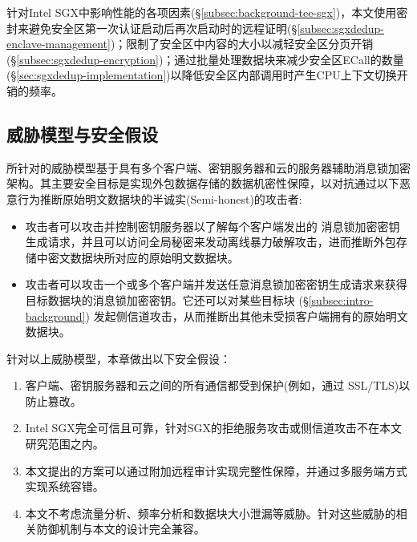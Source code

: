 针对Intel SGX中影响性能的各项因素(\S\ref{subsec:background-tee-sgx})，本文使用密封来避免安全区第一次认证启动后再次启动时的远程证明(\S\ref{subsec:sgxdedup-enclave-management})；限制了安全区中内容的大小以减轻安全区分页开销(\S\ref{subsec:sgxdedup-encryption})；通过批量处理数据块来减少安全区ECall的数量(\S\ref{sec:sgxdedup-implementation})以降低安全区内部调用时产生CPU上下文切换开销的频率。

\subsection{威胁模型与安全假设}
\label{subsec:sgxdedup-threat}

\sysnameS 所针对的威胁模型基于具有多个客户端、密钥服务器和云的服务器辅助消息锁加密架构\cite{bellare2013DupLESS}。其主要安全目标是实现外包数据存储\cite{bellare2013DupLESS}的数据机密性保障，以对抗通过以下恶意行为推断原始明文数据块的半诚实(Semi-honest)的攻击者:

\begin{itemize}[leftmargin=*]
    \item 攻击者可以攻击并控制密钥服务器以了解每个客户端发出的 消息锁加密密钥生成请求，并且可以访问全局秘密来发动离线暴力破解攻击\cite{bellare2013DupLESS}，进而推断外包存储中密文数据块所对应的原始明文数据块。
    \item 攻击者可以攻击一个或多个客户端并发送任意消息锁加密密钥生成请求来获得目标数据块的消息锁加密密钥\cite{bellare2013DupLESS}。它还可以对某些目标块 \cite{harnik2010side} (\S\ref{subsec:intro-background}) 发起侧信道攻击，从而推断出其他未受损客户端拥有的原始明文数据块。
\end{itemize}

针对以上威胁模型，本章做出以下安全假设：

\begin{enumerate}[leftmargin=*]
    \item 客户端、密钥服务器和云之间的所有通信都受到保护(例如，通过 SSL/TLS)以防止篡改。
    \item Intel SGX完全可信且可靠，针对SGX的拒绝服务攻击或侧信道攻击\cite{bulck2018FORESHADOW, oleksenko18}不在本文研究范围之内。
    \item 本文提出的方案可以通过附加远程审计\cite{ateniese2007provable, juels2007pors}实现完整性保障，并通过多服务端方式\cite{li15}实现系统容错。
    \item 本文不考虑流量分析\cite{zuo2018mitigating}、频率分析\cite{li2020TED}和数据块大小泄漏\cite{ritzdorf16}等威胁。针对这些威胁的相关防御机制\cite{zuo2018mitigating,li2020TED,ritzdorf16}与本文的设计完全兼容。
\end{enumerate}